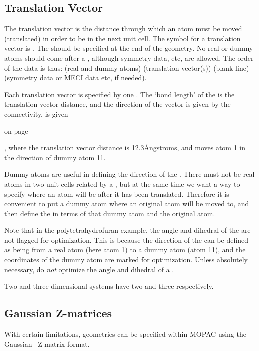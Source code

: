 \subsection{Translation Vector}
The translation vector is the distance through which an atom must be moved
(translated) in order to be in the next unit cell.  The symbol for a
translation vector is .  The  should be specified at the end
of the geometry. No real or dummy atoms should come after a , although
symmetry data, etc, are allowed.  The order of the data is thus: (real and
dummy atoms) (translation vector(s)) (blank line) (symmetry data or MECI data
etc, if needed).

Each translation vector is specified by one .  The `bond
length' of the  is the translation vector distance, and the
direction of the vector is given by the connectivity.   is given
\begin{latexonly}
on page~\pageref{pthf}
\end{latexonly}, where the translation vector distance is 12.3\AA ngstroms,
and moves atom 1 in the direction of dummy atom 11.

Dummy atoms are useful in defining the direction of the .  There must
not be real atoms in two unit cells related by a , but at the same
time we want a way to specify where an atom will be after it has been
translated.  Therefore it is convenient to put a dummy atom where an original
atom will be moved to, and then define the  in terms of that dummy
atom and the original atom.

Note that in the polytetrahydrofuran example, the angle and dihedral of the
 are not flagged for optimization.  This is because the direction of
the  can be defined as being from a real atom (here atom 1) to a dummy
atom (atom 11), and the coordinates of the dummy atom are marked for
optimization.  Unless  absolutely necessary, do {\em not} optimize the angle
and dihedral of a .

Two and three dimensional systems have two and three  respectively.
\subsection{Gaussian Z-matrices} With certain
limitations, geometries can be  specified  within MOPAC using the
Gaussian~\cite{gaussian-92}  Z-matrix format.


